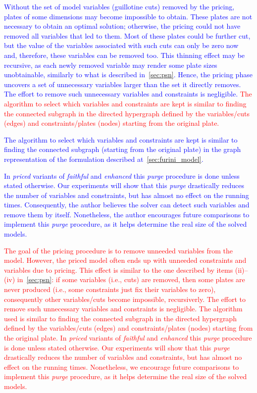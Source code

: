 \documentclass[ppgc,tese,english,formais,babel]{iiufrgs}
\newif\iffinalversion
\newcommand{\newtext}[1]{\iffinalversion%
#1%
\else%
\textcolor{blue}{#1}%
\fi%
}
\newcommand{\oldtext}[1]{\iffinalversion%
\else%
\textcolor{red}{#1}%
\fi%
}
\begin{document}
\newtext{
Without the set of model variables (guillotine cuts) removed by the pricing, plates of some dimensions may become impossible to obtain.
These plates are not necessary to obtain an optimal solution; otherwise, the pricing could not have removed all variables that led to them.
Most of these plates could be further cut, but the value of the variables associated with such cuts can only be zero now and, therefore, these variables can be removed too.
This thinning effect may be recursive, as each newly removed variable may render some plate sizes unobtainable, similarly to what is described in~\cref{sec:psn}.
Hence, the pricing phase uncovers a set of unnecessary variables larger than the set it directly removes.
The effort to remove such unnecessary variables and constraints is negligible.
\oldtext{The algorithm to select which variables and constraints are kept is similar to finding the connected subgraph in the directed hypergraph defined by the variables/cuts (edges) and constraints/plates (nodes) starting from the original plate.}
\newtext{The algorithm to select which variables and constraints are kept is similar to finding the connected subgraph (starting from the original plate) in the graph representation of the formulation described at~\cref{sec:furini_model}.}
In \emph{priced} variants of \emph{faithful} and \emph{enhanced} this \emph{purge} procedure is done unless stated otherwise.
Our experiments will show that this \emph{purge} drastically reduces the number of variables and constraints, but has almost no effect on the running times.
Consequently, the author believes the solver can detect such variables and remove them by itself.
Nonetheless, the author encourages future comparisons to implement this \emph{purge} procedure, as it helps determine the real size of the solved models.
}

\oldtext{The goal of the pricing procedure is to remove unneeded variables from the model. However, the priced model often ends up with unneeded constraints and variables due to pricing. This effect is similar to the one described by items (ii)--(iv) in~\autoref{sec:psn}: if some variables (i.e., cuts) are removed, then some plates are never produced (i.e., some constraints just fix their variables to zero), consequently other variables/cuts become impossible, recursiverly. The effort to remove such unnecessary variables and constraints is negligible. The algorithm used is similar to finding the connected subgraph in the directed hypergraph defined by the variables/cuts (edges) and constraints/plates (nodes) starting from the original plate. In \emph{priced} variants of \emph{faithful} and \emph{enhanced} this \emph{purge} procedure is done unless stated otherwise. Our experiments will show that this \emph{purge} drastically reduces the number of variables and constraints, but has almost no effect on the running times. Nonetheless, we encourage future comparisons to implement this \emph{purge} procedure, as it helps determine the real size of the solved models.}
\end{document}
